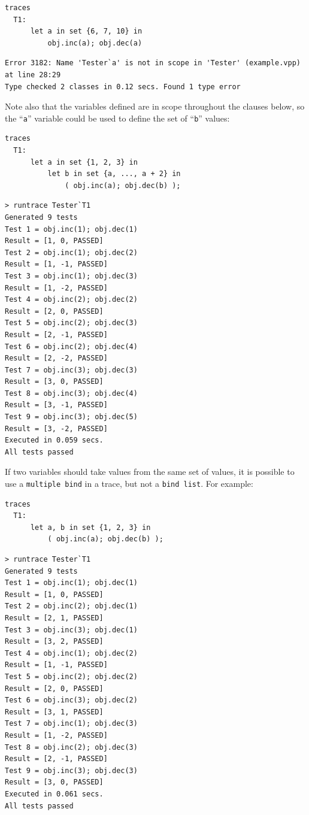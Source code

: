 \documentclass{overturerepchap}
\begin{document}
\small
\begin{lstlisting}
traces
  T1:
      let a in set {6, 7, 10} in
          obj.inc(a); obj.dec(a)
\end{lstlisting}
\scriptsize
\lstset{style=tool,language=}
\begin{lstlisting}[escapechar=@]
Error 3182: Name 'Tester`a' is not in scope in 'Tester' (example.vpp) at line 28:29
Type checked 2 classes in 0.12 secs. Found 1 type error
\end{lstlisting}
\lstset{style=mystyle}
\lstset{language=VDM++}
\normalsize

Note also that the variables defined are in scope
throughout the clauses below, so the ``\texttt{a}'' variable could be used to define the
set of ``\texttt{b}'' values:

\small
\begin{lstlisting}
traces
  T1:
      let a in set {1, 2, 3} in
          let b in set {a, ..., a + 2} in
              ( obj.inc(a); obj.dec(b) );
\end{lstlisting}

\lstset{style=tool,language=}
\begin{lstlisting}[escapechar=@]
> runtrace Tester`T1
Generated 9 tests
Test 1 = obj.inc(1); obj.dec(1)
Result = [1, 0, PASSED]
Test 2 = obj.inc(1); obj.dec(2)
Result = [1, -1, PASSED]
Test 3 = obj.inc(1); obj.dec(3)
Result = [1, -2, PASSED]
Test 4 = obj.inc(2); obj.dec(2)
Result = [2, 0, PASSED]
Test 5 = obj.inc(2); obj.dec(3)
Result = [2, -1, PASSED]
Test 6 = obj.inc(2); obj.dec(4)
Result = [2, -2, PASSED]
Test 7 = obj.inc(3); obj.dec(3)
Result = [3, 0, PASSED]
Test 8 = obj.inc(3); obj.dec(4)
Result = [3, -1, PASSED]
Test 9 = obj.inc(3); obj.dec(5)
Result = [3, -2, PASSED]
Executed in 0.059 secs. 
All tests passed
\end{lstlisting}
\lstset{style=mystyle}
\lstset{language=VDM++}
\normalsize

If two variables should take values from the same set of values, it is possible
to use a \texttt{multiple bind} in a trace, but not a \texttt{bind list}. For
example:

\small
\begin{lstlisting}
traces
  T1:
      let a, b in set {1, 2, 3} in
          ( obj.inc(a); obj.dec(b) );
\end{lstlisting}

\lstset{style=tool,language=}
\begin{lstlisting}[escapechar=@]
> runtrace Tester`T1
Generated 9 tests
Test 1 = obj.inc(1); obj.dec(1)
Result = [1, 0, PASSED]
Test 2 = obj.inc(2); obj.dec(1)
Result = [2, 1, PASSED]
Test 3 = obj.inc(3); obj.dec(1)
Result = [3, 2, PASSED]
Test 4 = obj.inc(1); obj.dec(2)
Result = [1, -1, PASSED]
Test 5 = obj.inc(2); obj.dec(2)
Result = [2, 0, PASSED]
Test 6 = obj.inc(3); obj.dec(2)
Result = [3, 1, PASSED]
Test 7 = obj.inc(1); obj.dec(3)
Result = [1, -2, PASSED]
Test 8 = obj.inc(2); obj.dec(3)
Result = [2, -1, PASSED]
Test 9 = obj.inc(3); obj.dec(3)
Result = [3, 0, PASSED]
Executed in 0.061 secs. 
All tests passed
\end{lstlisting}
\lstset{style=mystyle}
\lstset{language=VDM++}
\normalsize
\end{document}
